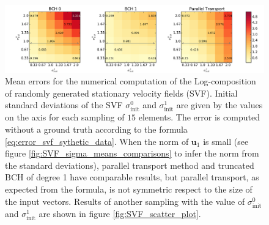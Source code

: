\begin{figure}[!ht]
	\hspace{-2.1cm}
	\includegraphics[scale=0.55]{figures/SVF_image_scale.pdf}
	\caption{Mean errors for the numerical computation of the Log-composition of randomly generated stationary velocity fields (SVF). Initial standard deviations of the SVF $\sigma_{\text{init}}^{0}$ and $\sigma_{\text{init}}^{1}$ are given by the values on the axis for each sampling of $15$ elements. The error is computed without a ground truth according to the formula \ref{eq:error_svf_sythetic_data}. When the norm of $\mathbf{u}_1$ is small (see figure \ref{fig:SVF_sigma_means_comparisons} to infer the norm from the standard deviations), parallel transport method and truncated BCH of degree 1 have comparable results, but parallel transport, as expected from the formula, is not symmetric respect to the size of the input vectors. Results of another sampling with the value of $\sigma_{\text{init}}^{0}$ and $\sigma_{\text{init}}^{1}$ are shown in figure \ref{fig:SVF_scatter_plot}.}
	\label{fig:SVF_image_scale}
\end{figure}

